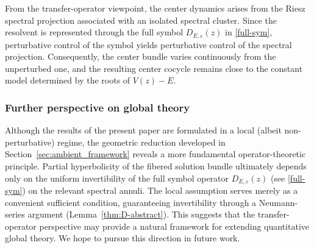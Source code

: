 \documentclass[reqno,11pt]{amsart}
\begin{document}
From the transfer-operator viewpoint, the center dynamics arises from the Riesz spectral projection associated with an isolated spectral cluster. Since the resolvent is represented through the full symbol $D_{E,\varepsilon}(z)$ in \eqref{full-sym}, perturbative control of the symbol yields perturbative control of the spectral projection. Consequently, the center bundle varies continuously from the unperturbed one, and the resulting center cocycle remains close to the constant model determined by the roots of $V(z)-E$. 

\subsubsection{Further perspective on global theory}

Although the results of the present paper are formulated in a local (albeit non-perturbative) regime, the geometric reduction developed in Section~\ref{sec:ambient_framework} reveals a more fundamental operator-theoretic principle. Partial hyperbolicity of the fibered solution bundle ultimately depends only on the uniform invertibility of the full symbol operator $D_{E,\varepsilon}(z)$ (see \eqref{full-sym}) on the relevant spectral annuli. The local assumption serves merely as a convenient sufficient condition, guaranteeing invertibility through a Neumann-series argument (Lemma~\ref{thm:D-abstract}).
This suggests that the transfer-operator perspective may provide a natural framework for extending quantitative global theory. We hope to pursue this direction in future work.
\end{document}

